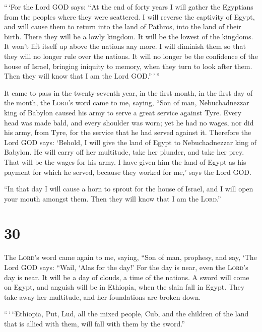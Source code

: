  ``\,`For the Lord GOD says: ``At the end of forty years
I will gather the Egyptians from the peoples where they were scattered.
 I will reverse the captivity of Egypt, and will cause
them to return into the land of Pathros, into the land of their birth.
There they will be a lowly kingdom.  It will be the
lowest of the kingdoms. It won't lift itself up above the nations any
more. I will diminish them so that they will no longer rule over the
nations.  It will no longer be the confidence of the
house of Israel, bringing iniquity to memory, when they turn to look
after them. Then they will know that I am the Lord GOD.''\,'\,''

 It came to pass in the twenty-seventh year, in the first
month, in the first day of the month, the \textsc{Lord}'s word came to
me, saying,  ``Son of man, Nebuchadnezzar king of Babylon
caused his army to serve a great service against Tyre. Every head was
made bald, and every shoulder was worn; yet he had no wages, nor did his
army, from Tyre, for the service that he had served against it.
 Therefore the Lord GOD says: `Behold, I will give the
land of Egypt to Nebuchadnezzar king of Babylon. He will carry off her
multitude, take her plunder, and take her prey. That will be the wages
for his army.  I have given him the land of Egypt as his
payment for which he served, because they worked for me,' says the Lord
GOD.

 ``In that day I will cause a horn to sprout for the
house of Israel, and I will open your mouth amongst them. Then they will
know that I am the \textsc{Lord}.''

\hypertarget{section-29}{%
\section{30}\label{section-29}}

 The \textsc{Lord}'s word came again to me, saying,
 ``Son of man, prophesy, and say, `The Lord GOD says:
``Wail, `Alas for the day!'  For the day is near, even the
\textsc{Lord}'s day is near. It will be a day of clouds, a time of the
nations.  A sword will come on Egypt, and anguish will be
in Ethiopia, when the slain fall in Egypt. They take away her multitude,
and her foundations are broken down.

 ``\,`\,``Ethiopia, Put, Lud, all the mixed people, Cub,
and the children of the land that is allied with them, will fall with
them by the sword.''

